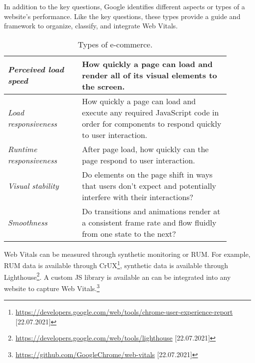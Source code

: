 
In addition to the key questions, Google identifies different aspects or types of a website's performance.
Like the key questions, these types provide a guide and framework to organize, classify, and integrate Web Vitals. %


\begin{table}[h]
	\small
	\centering
	\begin{tabular}{ p{0.3\linewidth} | p{0.6\linewidth} }
	\textit{Perceived load speed} & How quickly a page can load and render all of its visual elements to the screen. \\
	\hline
	\textit{Load responsiveness} & How quickly a page can load and execute any required JavaScript code in order for components to respond quickly to user interaction. \\
	\hline
	\textit{Runtime responsiveness} & After page load, how quickly can the page respond to user interaction. \\
	\hline
	\textit{Visual stability} & Do elements on the page shift in ways that users don't expect and potentially interfere with their interactions? \\
	\hline
	\textit{Smoothness} & Do transitions and animations render at a consistent frame rate and flow fluidly from one state to the next? \\
	\end{tabular}
	\medskip
	\caption{Types of e-commerce.}
	\label{table:types_ecommerce}
\end{table}



Web Vitals can be measured through synthetic monitoring or RUM. %
For example, RUM data is available through CrUX\footnote{\url{https://developers.google.com/web/tools/chrome-user-experience-report} [22.07.2021]}, synthetic data is available through Lighthouse\footnote{\url{https://developers.google.com/web/tools/lighthouse} [22.07.2021]}.
A custom JS library is available an can be integrated into any website to capture Web Vitals.\footnote{\url{https://github.com/GoogleChrome/web-vitals} [22.07.2021]}



